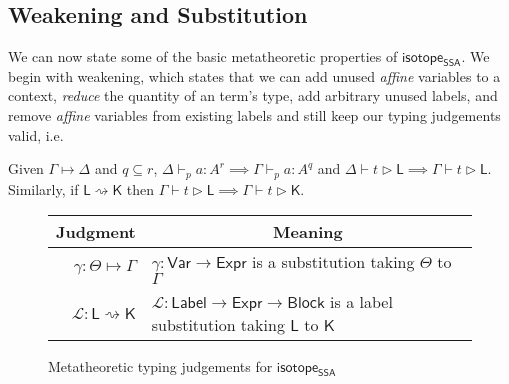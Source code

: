 \documentclass[acmsmall,screen,review]{acmart}
\newcommand{\mc}[1]{\ensuremath{\mathcal{#1}}}
\newcommand{\ms}[1]{\ensuremath{\mathsf{#1}}}
\newcommand{\cwk}[2]{#1 \mapsto #2}
\newcommand{\lwk}[2]{#1 \rightsquigarrow #2}
\newcommand{\hasty}[5]{#1 \vdash_{#2} #3: {#4}^{#5}}
\newcommand{\haslb}[3]{#1 \vdash #2 \rhd #3}
\newcommand{\issubst}[3]{#1: #2 \mapsto #3}
\newcommand{\lbsubst}[3]{#1: #2 \rightsquigarrow #3}
\newcommand{\isotopessa}{\ms{isotope_{SSA}}}
\begin{document}
\subsection{Weakening and Substitution}

We can now state some of the basic metatheoretic properties of \isotopessa. We
begin with weakening, which states that we can add unused \textit{affine} variables to a context,
\textit{reduce} the quantity of an term's type, add arbitrary unused labels, and
remove \textit{affine} variables from existing labels and still keep our typing
judgements valid, i.e.
\begin{lemma}[Weakening] 
  Given \(\cwk{\Gamma}{\Delta}\) and \(q \subseteq r\),
  \(\hasty{\Delta}{p}{a}{A}{r} \implies \hasty{\Gamma}{p}{a}{A}{q}\) and
  \(\haslb{\Delta}{t}{\ms{L}} \implies \haslb{\Gamma}{t}{\ms{L}}\). Similarly,
  if \(\lwk{\ms{L}}{\ms{K}}\) then \(\haslb{\Gamma}{t}{\ms{L}} \implies
  \haslb{\Gamma}{t}{\ms{K}}\).
\end{lemma}

\begin{figure}
  \begin{center}        
    \begingroup
    \renewcommand{\arraystretch}{1.5}
    \setlength{\tabcolsep}{2em}
    \begin{tabular}{rl}
        \multicolumn{1}{c}{Judgment} & \multicolumn{1}{c}{Meaning} \\ \hline
        \(\issubst{\gamma}{\Theta}{\Gamma}\) &
        \(\gamma: \ms{Var} \to \ms{Expr}\) is a substitution taking \(\Theta\) to \(\Gamma\) \\
        \(\lbsubst{\mc{L}}{\ms{L}}{\ms{K}}\) &
        \(\mc{L}: \ms{Label} \to \ms{Expr} \to \ms{Block}\) is a label substitution taking \(\ms{L}\) to \(\ms{K}\)
    \end{tabular}
    \endgroup
  \end{center}
  \caption{Metatheoretic typing judgements for \isotopessa}
  \label{fig:ssa-meta-judgements}
\end{figure}
\end{document}
